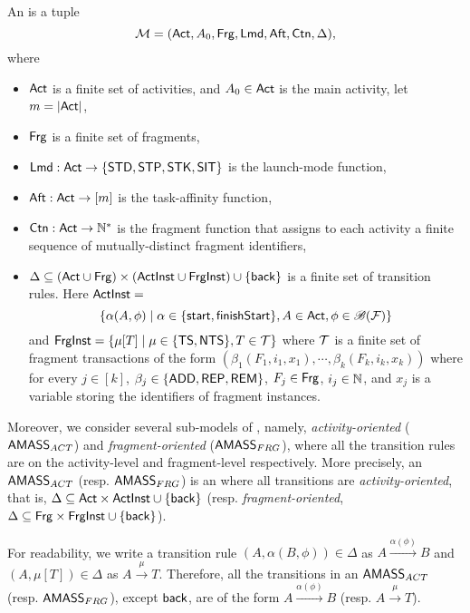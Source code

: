 \begin{definition} \label{def:afsm}
An {\AMASS} is a tuple 
$${\mathcal{M} } = ({\sf Act}, A_0,{\sf Frg}, {\sf Lmd}, {\sf Aft}, {\sf Ctn}, \Delta),$$ where 
\begin{itemize}
\item ${\sf Act}$ is a finite set of activities, and $A_0 \in {\sf Act}$ is the main activity, let $m=|{\sf Act}|$,
\item ${\sf Frg}$ is a finite set of fragments, 
\item ${\sf Lmd} : {\sf Act} \rightarrow \{{\sf STD},{\sf STP},{\sf STK},{\sf SIT}\}$ is the launch-mode function,
%
\item ${\sf Aft} : {\sf Act} \rightarrow [m]$ is the task-affinity function,
%
\item ${\sf Ctn}: {\sf Act} \rightarrow {\mathbb{N} }^*$ is the fragment {\container} function that assigns to each activity a finite sequence of mutually-distinct fragment {\container} identifiers,
% 
%
\item $\Delta \subseteq ({\sf Act} \cup {\sf Frg}) \times ( {\mathsf{ActInst} } \cup {\mathsf{FrgInst} })\cup\{{\mathsf{back} }\}$ is a finite set of transition rules. Here ${\mathsf{ActInst} } =$ 
$$\{\alpha(A, \phi) \mid \alpha \in  \{{\mathsf{start} }, {\mathsf{finishStart} }\}, A \in {\sf Act}, \phi \in \mathscr{B}(\mathcal{F})\}$$ 
and ${\mathsf{FrgInst} } =  \{\mu[T] \mid  \mu \in \{{\sf TS}, {\sf NTS}\}, T \in \mathcal{T}\}$ where $\mathcal{T}$ is a finite set of fragment transactions of the form $(\beta_1(F_1, i_1, x_1), \cdots, \beta_k(F_k, i_k, x_k))$ where for every $j \in [k]$, $\beta_j \in \{\mathsf{ADD}, \mathsf{REP}, \mathsf{REM}\}$, $F_j \in {\sf Frg}$, $i_j \in {\mathbb{N} }$, and $x_j$ is a variable storing the identifiers of fragment instances.
\end{itemize}
%
Moreover, we consider several sub-models of {\AMASS}, namely, \emph{activity-oriented} {\AMASS} ($\textsf{AMASS}_{ACT}$) and \emph{fragment-oriented} {\AMASS} ($\textsf{AMASS}_{FRG}$), where all the transition rules are on the activity-level and fragment-level respectively. More precisely, an $\textsf{AMASS}_{ACT}$ (resp. $\textsf{AMASS}_{FRG}$) is an {\AMASS} where all transitions are \emph{activity-oriented}, that is, $\Delta \subseteq {\sf Act} \times {\mathsf{ActInst} } \cup \{{\mathsf{back} }\}$  (resp. \emph{fragment-oriented}, $\Delta \subseteq {\sf Frg} \times {\mathsf{FrgInst} } \cup \{{\mathsf{back} }\}$).
\end{definition}

%
For readability, we write a transition rule $(A, \alpha(B, \phi))\in \Delta$ as $A \xrightarrow{\alpha(\phi)} B$
and 
$(A, \mu[T])\in \Delta$ as $A \xrightarrow{\mu} T$. 
Therefore, all the transitions in an $\textsf{AMASS}_{ACT}$ (resp. $\textsf{AMASS}_{FRG}$), except ${\mathsf{back} }$, are of the form $A \xrightarrow{\alpha(\phi)} B$ (resp. $A \xrightarrow{\mu} T$).



